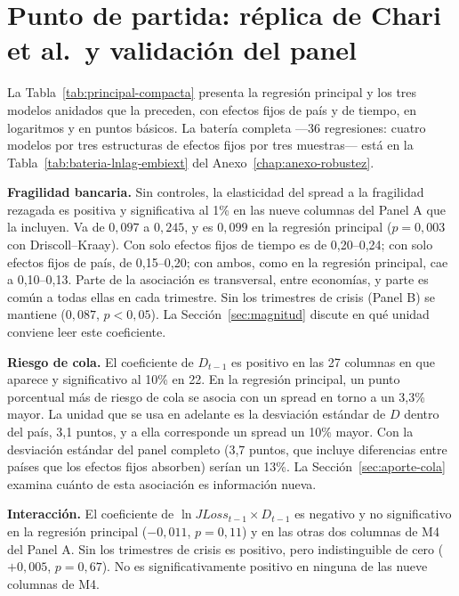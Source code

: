 \section{Punto de partida: réplica de Chari et al.\ y validación del panel}
\label{sec:bateria}

La Tabla~\ref{tab:principal-compacta} presenta la regresión principal y los tres modelos anidados que la preceden, con efectos fijos de país y de tiempo, en logaritmos y en puntos básicos. La batería completa ---36 regresiones: cuatro modelos por tres estructuras de efectos fijos por tres muestras--- está en la Tabla~\ref{tab:bateria-lnlag-embiext} del Anexo~\ref{chap:anexo-robustez}.



\textbf{Fragilidad bancaria.} Sin controles, la elasticidad del spread a la fragilidad rezagada es positiva y significativa al 1\% en las nueve columnas del Panel A que la incluyen. Va de $0{,}097$ a $0{,}245$, y es $0{,}099$ en la regresión principal ($p=0{,}003$ con Driscoll--Kraay). Con solo efectos fijos de tiempo es de 0,20--0,24; con solo efectos fijos de país, de 0,15--0,20; con ambos, como en la regresión principal, cae a 0,10--0,13. Parte de la asociación es transversal, entre economías, y parte es común a todas ellas en cada trimestre. Sin los trimestres de crisis (Panel B) se mantiene ($0{,}087$, $p<0{,}05$). La Sección~\ref{sec:magnitud} discute en qué unidad conviene leer este coeficiente.

\textbf{Riesgo de cola.} El coeficiente de $D_{t-1}$ es positivo en las 27 columnas en que aparece y significativo al 10\% en 22. En la regresión principal, un punto porcentual más de riesgo de cola se asocia con un spread en torno a un 3,3\% mayor. La unidad que se usa en adelante es la desviación estándar de $D$ dentro del país, 3,1 puntos, y a ella corresponde un spread un 10\% mayor. Con la desviación estándar del panel completo (3,7 puntos, que incluye diferencias entre países que los efectos fijos absorben) serían un 13\%. La Sección~\ref{sec:aporte-cola} examina cuánto de esta asociación es información nueva.

\textbf{Interacción.} El coeficiente de $\ln JLoss_{t-1}\times D_{t-1}$ es negativo y no significativo en la regresión principal ($-0{,}011$, $p=0{,}11$) y en las otras dos columnas de M4 del Panel A. Sin los trimestres de crisis es positivo, pero indistinguible de cero ($+0{,}005$, $p=0{,}67$). No es significativamente positivo en ninguna de las nueve columnas de M4.

